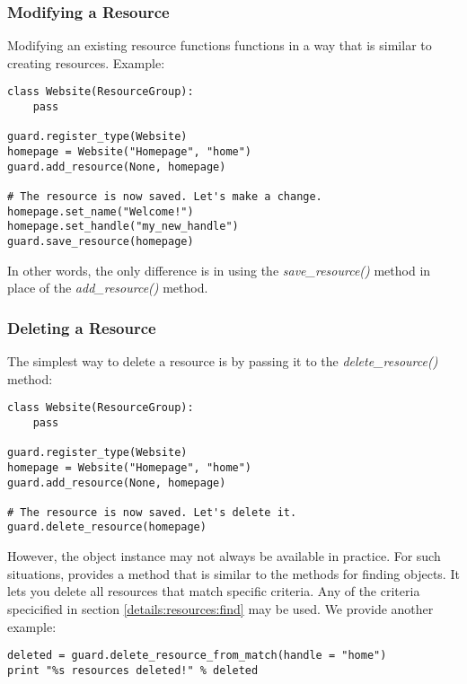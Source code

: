 \subsubsection{\label{details:resources:modify}Modifying a Resource}

Modifying an existing resource functions functions in a way that is 
similar to creating resources. Example:

\begin{lstlisting}
class Website(ResourceGroup):
    pass

guard.register_type(Website)
homepage = Website("Homepage", "home")
guard.add_resource(None, homepage)

# The resource is now saved. Let's make a change.
homepage.set_name("Welcome!")
homepage.set_handle("my_new_handle")
guard.save_resource(homepage)
\end{lstlisting}

In other words, the only difference is in using the {\it save\_resource()} 
method in place of the {\it add\_resource()} method.


\subsubsection{\label{details:resources:delete}Deleting a Resource}

The simplest way to delete a resource is by passing it to the 
{\it delete\_resource()} method:

\begin{lstlisting}
class Website(ResourceGroup):
    pass

guard.register_type(Website)
homepage = Website("Homepage", "home")
guard.add_resource(None, homepage)

# The resource is now saved. Let's delete it.
guard.delete_resource(homepage)
\end{lstlisting}

However, the object instance may not always be available in practice. For 
such situations, \product provides a method that is similar to the methods 
for finding objects. It lets you delete all resources that match specific 
criteria. Any of the criteria specicified in section 
\ref{details:resources:find} may be used. We provide another example:

\begin{lstlisting}
deleted = guard.delete_resource_from_match(handle = "home")
print "%s resources deleted!" % deleted
\end{lstlisting}


